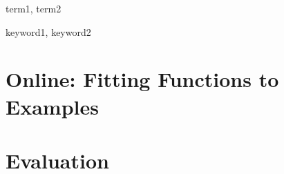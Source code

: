 \documentclass[preprint]{sigplanconf}
\begin{document}

\terms
term1, term2

\keywords
keyword1, keyword2














\section{Online: Fitting Functions to Examples} \label{synth}


\section{Evaluation}\label{evaluation}








\end{document}
